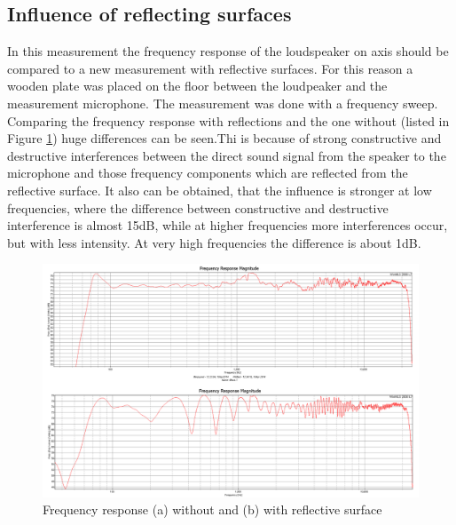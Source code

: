 \documentclass{article}
\begin{document}
\subsection{Influence of reflecting surfaces}
In this measurement the frequency response of the loudspeaker on axis should be compared to a new measurement with reflective surfaces. For this reason a wooden plate was placed on the floor between the loudpeaker and the measurement microphone. The measurement was done with a frequency sweep. Comparing the frequency response with reflections and the one without (listed in Figure \ref{fig:TaskC}) huge differences can be seen.Thi is because of strong constructive and destructive interferences between the direct sound signal from the speaker to the microphone and those frequency components which are reflected from the reflective surface.  It also can be obtained, that the influence is stronger at low frequencies, where the difference between constructive and destructive interference is almost 15dB, while at higher frequencies more interferences occur, but with less intensity. At very high frequencies the difference is about 1dB.
\begin{figure}[htbp]
\begin{center}
\includegraphics[width=15cm,keepaspectratio=true]{Figures/TaskC}
\caption{Frequency response (a) without and (b) with reflective surface}
\label{fig:TaskC}
\end{center}
\end{figure}

\newpage
\end{document}
